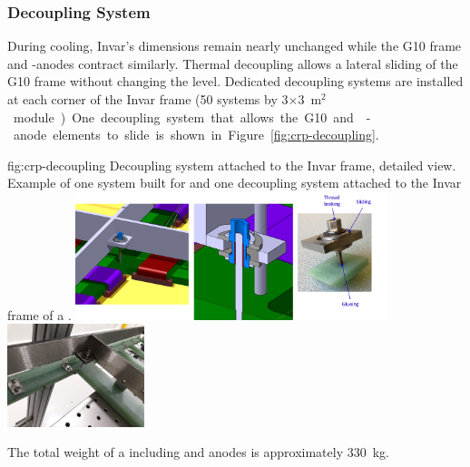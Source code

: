 \subsubsection{Decoupling System}
 
During cooling, Invar's dimensions remain nearly unchanged while the G10 frame and -anodes contract similarly. Thermal decoupling allows a lateral sliding of the G10 frame without changing the level. 
Dedicated decoupling systems are installed at each corner of the Invar frame (\num{50} systems by  \num{3}$\times$\SI{3}{m$^{2}$} module). One decoupling system that allows the G10 and -anode elements to slide is shown in  Figure~\ref{fig:crp-decoupling}.

\begin{dunefigure}{fig:crp-decoupling}
{Decoupling system attached to the Invar frame, detailed view. Example of one system built for  and one decoupling system attached to the Invar frame of a .}
\includegraphics[width=0.68\textwidth]{graphics/decoupling}
\includegraphics[width=0.30\textwidth]{graphics/decoupling-crp}
\end{dunefigure}

The total weight of a  including  and anodes is approximately \SI{330}{kg}.

